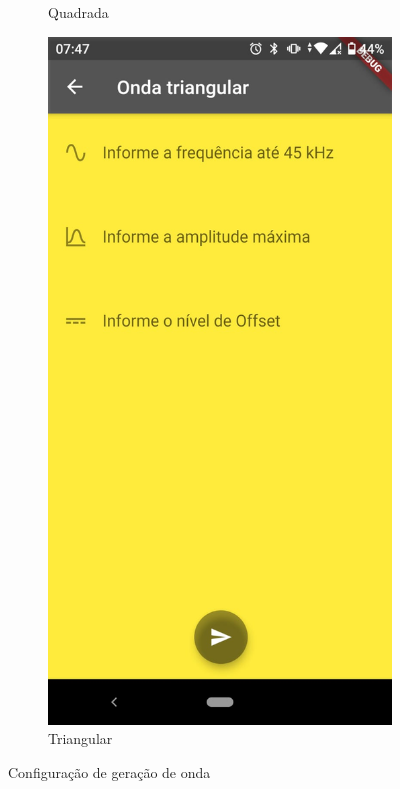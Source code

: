 \documentclass[12pt,a4paper]{book}
\begin{document}
\begin{figure}
\begin{subfigure}[b]{0.3\textwidth}
        \caption{Quadrada}
        \label{fig:sq}
    \end{subfigure}
    \begin{subfigure}[b]{0.3\textwidth}
        \centering
        \includegraphics[width=\textwidth]{figs/tri.png}
        \caption{Triangular}
        \label{fig:tri}
    \end{subfigure}

    \caption{Configuração de geração de onda}
    \label{fig:telas app}
\end{figure}
\end{document}
